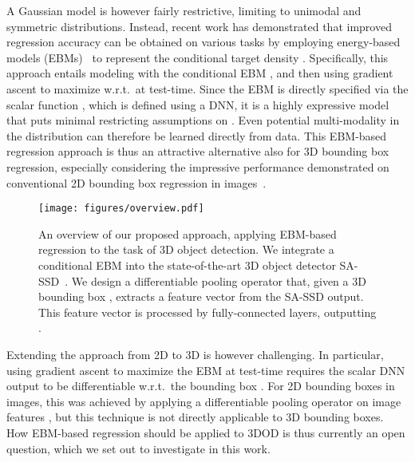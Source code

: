 \documentclass[letterpaper, 10 pt, conference]{ieeeconf}
\begin{document}
A Gaussian model is however fairly restrictive, limiting  to unimodal and symmetric distributions. Instead, recent work \cite{gustafsson2019learning, danelljan2020probabilistic, gustafsson2020train} has demonstrated that improved regression accuracy can be obtained on various tasks by employing energy-based models (EBMs)~\cite{lecun2006tutorial} to represent the conditional target density . Specifically, this approach entails modeling  with the conditional EBM , and then using gradient ascent to maximize  w.r.t.\  at test-time. Since the EBM  is directly specified via the scalar function , which is defined using a DNN, it is a highly expressive model that puts minimal restricting assumptions on . Even potential multi-modality in the distribution  can therefore be learned directly from data. This EBM-based regression approach is thus an attractive alternative also for 3D bounding box regression, especially considering the impressive performance demonstrated on conventional 2D bounding box regression in images~\cite{gustafsson2019learning, danelljan2020probabilistic, gustafsson2020train}.

\begin{figure*}[t]
    \centering
    \texttt{[image: figures/overview.pdf]}\vspace{-2.0mm}
    \caption{An overview of our proposed approach, applying EBM-based regression to the task of 3D object detection. We integrate a conditional EBM  into the state-of-the-art 3D object detector SA-SSD~\cite{he2020structure}. We design a differentiable pooling operator that, given a 3D bounding box , extracts a feature vector from the SA-SSD output. This feature vector is processed by fully-connected layers, outputting .}\vspace{-3mm}
    \label{fig:overview}
\end{figure*}

Extending the approach from 2D to 3D is however challenging. In particular, using gradient ascent to maximize the EBM  at test-time requires the scalar DNN output  to be differentiable w.r.t.\ the bounding box . For 2D bounding boxes in images, this was achieved by applying a differentiable pooling operator \cite{jiang2018acquisition} on image features \cite{gustafsson2019learning, danelljan2020probabilistic, gustafsson2020train}, but this technique is not directly applicable to 3D bounding boxes. How EBM-based regression should be applied to 3DOD is thus currently an open question, which we set out to investigate in this work.
\end{document}
